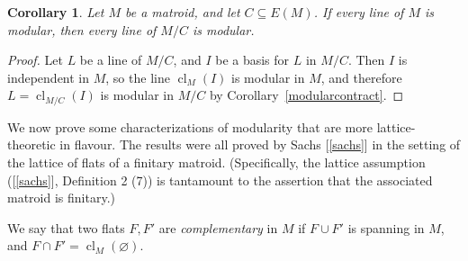 \documentclass{amsart}
\theoremstyle{plain}
\newtheorem{corollary}[theorem]{Corollary}
\theoremstyle{definition}
\DeclareMathOperator{\cl}{cl}
\newcommand{\con}{/}
\newcommand{\es}{\varnothing}
\renewcommand{\ss}{\subseteq}
\begin{document}
\begin{corollary}\label{linemodularcontract}
  Let $M$ be a matroid, and let $C \ss E(M)$. If every line of $M$ is modular, 
  then every line of $M \con C$ is modular. 
\end{corollary}
\begin{proof}
  Let $L$ be a line of $M \con C$, and $I$ be a basis for $L$ in $M \con C$. 
  Then $I$ is independent in $M$, so the line $\cl_M(I)$ is modular in $M$, 
  and therefore $L = \cl_{M \con C}(I)$ is modular in $M \con C$ by Corollary~\ref{modularcontract}. 
\end{proof}

We now prove some characterizations of modularity that are more lattice-theoretic in 
flavour. The results were all proved by Sachs [\ref{sachs}]
in the setting of the lattice of flats of a finitary matroid. 
(Specifically, the lattice assumption ([\ref{sachs}], Definition 2 (7)) is tantamount 
to the assertion that the associated matroid is finitary.)

We say that two flats $F,F'$ are \emph{complementary} in $M$ if $F \cup F'$ is spanning in $M$, and $F \cap F' = \cl_M(\es)$. 
\end{document}
